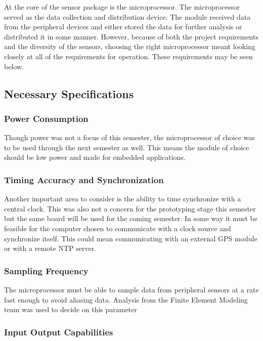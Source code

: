 
\indent At the core of the sensor package is the microprocessor. The
microprocessor served as the data collection and distribution
device. The module received data from the peripheral devices and
either stored the data for further analysis or distributed it in
some manner. However, because of both the project requirements
and the diversity of the sensors, choosing the right
microprocessor meant looking closely at all of the requirements
for operation. These requirements may be seen below. 
\subsection{Necessary Specifications}
\subsubsection{Power Consumption}

\indent Though power was not a focus of this semester, the
microprocessor of choice was to be used through the next semester
as well. This means the module of choice should be low power and
made for embedded applications. 

\subsubsection{Timing Accuracy and Synchronization}

\indent Another important area to consider is the ability to time
synchronize with a central clock. This was also not a concern for
the prototyping stage this semester but the same board will be used
for the coming semester. In some way it must be feasible for the
computer chosen to communicate with a clock source and
synchronize itself. This could mean communicating with an
external GPS module or with a remote NTP server. 
\subsubsection{Sampling Frequency}

The microprocessor must be able to sample data from peripheral sensors at a rate fast enough to avoid aliasing data. Analysis from the Finite Element Modeling team was used to decide on this parameter

\subsubsection{Input Output Capabilities}

